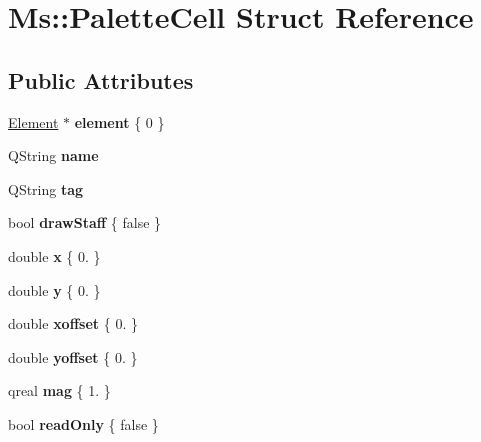 \hypertarget{struct_ms_1_1_palette_cell}{}\section{Ms\+:\+:Palette\+Cell Struct Reference}
\label{struct_ms_1_1_palette_cell}
\subsection*{Public Attributes}
\begin{DoxyCompactItemize}
\item 
\mbox{\label{struct_ms_1_1_palette_cell_a0096af214a1201535a6707a7233dfbef}} 
\hyperlink{class_ms_1_1_element}{Element} $\ast$ {\bfseries element} \{ 0 \}
\item 
\mbox{\label{struct_ms_1_1_palette_cell_a2d0ea85093da6087588ff34fdf9fe678}} 
Q\+String {\bfseries name}
\item 
\mbox{\label{struct_ms_1_1_palette_cell_ac5a82d4d15a11dc12e54e9fb0378b605}} 
Q\+String {\bfseries tag}
\item 
\mbox{\label{struct_ms_1_1_palette_cell_acb2a83f69d6cb90d28271f35c77dffb8}} 
bool {\bfseries draw\+Staff} \{ false \}
\item 
\mbox{\label{struct_ms_1_1_palette_cell_aa72fe5e45f62eaa3782f0e44a5430d23}} 
double {\bfseries x} \{ 0. \}
\item 
\mbox{\label{struct_ms_1_1_palette_cell_acac11b4a76c1b665bbfe3f20efea0ad0}} 
double {\bfseries y} \{ 0. \}
\item 
\mbox{\label{struct_ms_1_1_palette_cell_a4b89ac83d0cd9b2c277357a74008f212}} 
double {\bfseries xoffset} \{ 0. \}
\item 
\mbox{\label{struct_ms_1_1_palette_cell_a147d4fdcb57728c64a1fb9869ceb805b}} 
double {\bfseries yoffset} \{ 0. \}
\item 
\mbox{\label{struct_ms_1_1_palette_cell_a8e6d6b9386293fdaac318aa9baee7686}} 
qreal {\bfseries mag} \{ 1. \}
\item 
\mbox{\label{struct_ms_1_1_palette_cell_a31549d071ca74bcd1cb97af1bd1bdcfb}} 
bool {\bfseries read\+Only} \{ false \}
\end{DoxyCompactItemize}



